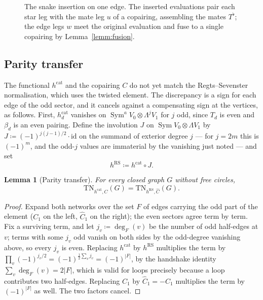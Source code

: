 \documentclass[11pt]{article}
\newtheorem{lemm}[theo]{Lemma}
\newcommand{\copair}{C}                           %
\newcommand{\twistedC}{\widehat{C}}               %
\newcommand{\mate}[1]{#1^{\flat}}                 %
\newcommand{\SymV}{\operatorname{Sym}}
\newcommand{\parinv}{J}                           %
\begin{document}
\begin{figure}
\centering

\caption{The snake insertion on one edge. The inserted
evaluations pair each star leg with the mate leg $u$ of a
copairing, assembling the mates $\mate{T}$; the edge legs $w$ meet
the original evaluation and fuse to a single copairing by
Lemma~\ref{lemm:fusion}.}
\label{fig:snake}
\end{figure}

\subsection{Parity transfer}\label{subsec:paritytransfer}

The functional $h^{\mathrm{cat}}$ and the copairing $\copair$ do
not yet match the Regts--Sevenster normalisation, which uses the
twisted element. The discrepancy is a sign for each edge of the
odd sector, and it cancels against a compensating sign at the
vertices, as follows. First,
$h^{\mathrm{cat}}_{d}$ vanishes on
$\SymV^{a}V_{0}\otimes\Lambda^{j}V_{1}$ for $j$ odd, since
$T_{d}$ is even and $\beta_{d}$ is an even pairing. Define the
involution $\parinv$ on $\SymV V_{0}\otimes\Lambda V_{1}$ by
$\parinv\coloneqq(-1)^{j(j-1)/2}\cdot\mathrm{id}$ on the summand
of exterior degree $j$ --- for $j=2m$ this is $(-1)^{m}$, and the
odd-$j$ values are immaterial by the vanishing just noted --- and
set
\[
h^{\mathrm{RS}}\coloneqq h^{\mathrm{cat}}\circ\parinv .
\]

\begin{lemm}[Parity transfer]\label{lemm:paritytransfer}
For every closed graph $G$ without free circles,
\[
\mathrm{TN}_{h^{\mathrm{cat}},\copair}(G)
=\mathrm{TN}_{h^{\mathrm{RS}},\twistedC}(G).
\]
\end{lemm}

\begin{proof}
Expand both networks over the set $F$ of edges carrying the odd
part of the element ($\copair_{1}$ on the left, $\twistedC_{1}$
on the right); the even sectors agree term by term. Fix a
surviving term, and let $j_{v}\coloneqq\deg_{F}(v)$ be the number
of odd half-edges at $v$; terms with some $j_{v}$ odd vanish on
both sides by the odd-degree vanishing above, so every $j_{v}$ is
even. Replacing $h^{\mathrm{cat}}$ by $h^{\mathrm{RS}}$
multiplies the term by
$\prod_{v}(-1)^{j_{v}/2}=(-1)^{\frac12\sum_{v}j_{v}}
=(-1)^{|F|}$, by the handshake identity
$\sum_{v}\deg_{F}(v)=2|F|$, which is valid for loops precisely
because a loop contributes two half-edges. Replacing
$\copair_{1}$ by $\twistedC_{1}=-\copair_{1}$ multiplies the term
by $(-1)^{|F|}$ as well. The two factors cancel.
\end{proof}
\end{document}
